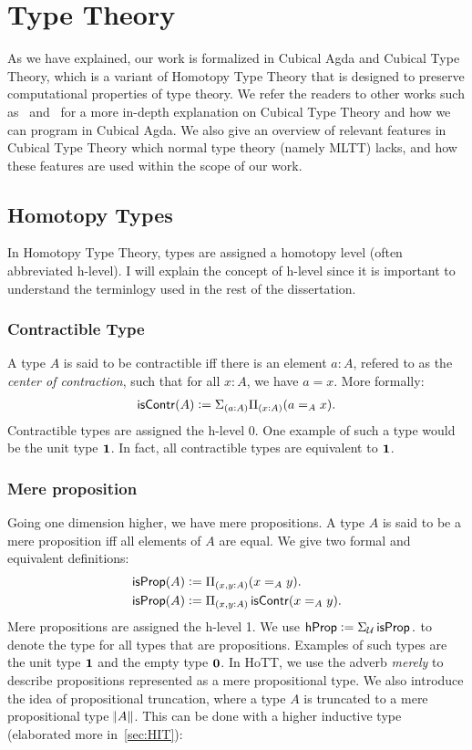 \section{Type Theory}\label{sec:type-theory}
As we have explained, our work is formalized in Cubical Agda and Cubical Type Theory,
which is a variant of Homotopy Type Theory that is designed to preserve
computational properties of type theory.
We refer the readers to other works such as~\cite{vezzosiCubicalAgdaDependently2019}
and~\cite{cohenCubicalTypeTheory2018} for a more in-depth explanation on Cubical Type Theory
and how we can program in Cubical Agda.
We also give an overview of relevant features
in Cubical Type Theory which normal type theory (namely MLTT) lacks, and how these features
are used within the scope of our work.
\subsection{Homotopy Types}
In Homotopy Type Theory, types are assigned a homotopy level
(often abbreviated h-level). I will explain the concept of h-level
since it is important to understand the terminlogy used in the rest
of the dissertation.
\subsubsection{Contractible Type}
A type $A$ is said to be contractible iff there is an element
$a : A$, refered to as the \emph{center of contraction}, such that
for all $x: A$, we have $a = x$. More formally:
\begin{align*}
    \operatorname{\mathsf{isContr}}(A) := \Sigma_{(a : A)}\Pi_{(x : A)}(a =_A x).
\end{align*}
Contractible types are assigned the h-level 0.
One example of such a type would be the unit type ${\mathbf{1}}$.
In fact, all contractible types are equivalent to ${\mathbf{1}}$.
\subsubsection{Mere proposition}
Going one dimension higher, we have mere propositions. A type $A$
is said to be a mere proposition iff all elements of $A$ are equal.
We give two formal and equivalent definitions:
\begin{align*}
    \operatorname{\mathsf{isProp}}(A) & := \Pi_{(x,y : A)}(x =_A y).\\
    \operatorname{\mathsf{isProp}}(A) & := \Pi_{(x,y : A)}\operatorname{\mathsf{isContr}}(x =_A y).\\
\end{align*}
Mere propositions are assigned the h-level 1.
We use $\mathsf{hProp} := \Sigma_{\mathcal{U}} \operatorname{\mathsf{isProp}}.$ to denote the type for
all types that are propositions.
Examples of such types
are the unit type ${\mathbf{1}}$ and the empty type ${\mathbf{0}}$. In HoTT,
we use the adverb \emph{merely} to describe propositions represented
as a mere propositional type. We also introduce the idea of
propositional truncation, where a type $A$ is truncated to 
a mere propositional type $\norm{A}$. This can be done with a higher
inductive type (elaborated more in~\cref{sec:HIT}):

